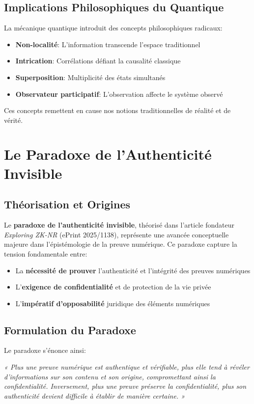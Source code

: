 \subsection{Implications Philosophiques du Quantique}
La mécanique quantique introduit des concepts philosophiques radicaux:
\begin{itemize}
\item \textbf{Non-localité}: L'information transcende l'espace traditionnel
\item \textbf{Intrication}: Corrélations défiant la causalité classique
\item \textbf{Superposition}: Multiplicité des états simultanés
\item \textbf{Observateur participatif}: L'observation affecte le système observé
\end{itemize}

Ces concepts remettent en cause nos notions traditionnelles de réalité et de vérité.
\section{Le Paradoxe de l'Authenticité Invisible}
\subsection{Théorisation et Origines}
Le \textbf{paradoxe de l'authenticité invisible}, théorisé dans l'article fondateur \textit{Exploring ZK-NR} (ePrint 2025/1138), représente une avancée conceptuelle majeure dans l'épistémologie de la preuve numérique. Ce paradoxe capture la tension fondamentale entre:

\begin{itemize}
\item La \textbf{nécessité de prouver} l'authenticité et l'intégrité des preuves numériques
\item L'\textbf{exigence de confidentialité} et de protection de la vie privée
\item L'\textbf{impératif d'opposabilité} juridique des éléments numériques
\end{itemize}

\subsection{Formulation du Paradoxe}
Le paradoxe s'énonce ainsi: 

\emph{« Plus une preuve numérique est authentique et vérifiable, plus elle tend à révéler d'informations sur son contenu et son origine, compromettant ainsi la confidentialité. Inversement, plus une preuve préserve la confidentialité, plus son authenticité devient difficile à établir de manière certaine. »}

